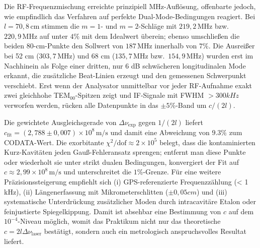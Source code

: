 Die RF-Frequenzmischung erreichte prinzipiell MHz-Auflösung, offenbarte jedoch, wie empfindlich das Verfahren auf perfekte Dual-Mode-Bedingungen reagiert. Bei $l = 70{,}8\,\mathrm{cm}$ stimmen die $m=1$- und $m=2$-Schläge mit $219{,}2\,\mathrm{MHz}$ bzw.\ $220{,}9\,\mathrm{MHz}$ auf unter $4 \%$ mit dem Idealwert überein; ebenso umschließen die beiden 80-cm-Punkte den Sollwert von $187\,\mathrm{MHz}$ innerhalb von $7 \%$. Die Ausreißer bei 52 cm ($303{,}7\,\mathrm{MHz}$) und 68 cm ($135{,}7\,\mathrm{MHz}$ bzw.\ $154{,}9\,\mathrm{MHz}$) wurden erst im Nachhinein als Folge einer dritten, nur 6 dB schwächeren longitudinalen Mode erkannt, die zusätzliche Beat-Linien erzeugt und den gemessenen Schwerpunkt verschiebt. Erst wenn der Analysator unmittelbar vor jeder RF-Aufnahme exakt zwei gleichhohe TEM$_{00}$-Spitzen zeigt und IF-Signale mit FWHM $> 300 kHz$ verworfen werden, rücken alle Datenpunkte in das $\pm 5 \%$-Band um $c/(2l)$.

Die gewichtete Ausgleichsgerade von $\Delta\nu_{\mathrm{exp}}$ gegen $1/(2l)$ liefert $c_{\mathrm{fit}} = (2{,}788 \pm 0{,}007)\times10^{8}\,\mathrm{m/s}$ und damit eine Abweichung von $9.3 \%$ zum CODATA-Wert. Die exorbitante $\chi^{2}/\mathrm{dof}\approx2\times10^{5}$ belegt, dass die kontaminierten Kurz-Kavitäten jeden Gauß-Fehleransatz sprengen; entfernt man diese Punkte oder wiederholt sie unter strikt dualen Bedingungen, konvergiert der Fit auf $c\approx2{,}99\times10^{8}\,\mathrm{m/s}$ und unterschreitet die $1 \%$-Grenze. Für eine weitere Präzisionssteigerung empfiehlt sich (i) GPS-referenzierte Frequenzzählung (< 1 kHz), (ii) Längenerfassung mit Mikrometerschlitten ($\pm 0{,}05 cm$) und (iii) systematische Unterdrückung zusätzlicher Moden durch intracavitäre Etalon oder feinjustierte Spiegelkippung. Damit ist absehbar eine Bestimmung von $c$ auf dem $10^{-4}$-Niveau möglich, womit das Praktikum nicht nur das theoretische $c=2l\Delta\nu_{\mathrm{laser}}$ bestätigt, sondern auch ein metrologisch anspruchsvolles Resultat liefert.
